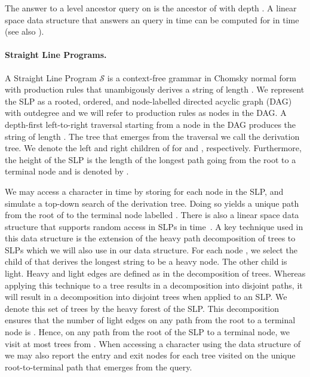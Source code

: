 \documentclass[11pt]{article}
\newcommand{\slp}{\ensuremath{\mathcal{S}} }
\begin{document}
The answer to a level ancestor query  on  is the ancestor of  with depth . A linear space data structure that answers an  query in  time can be computed for  in  time~\cite{dietz1991finding} (see also \cite{berkman1994finding,alstrup2000improved,bender2004level}).


\paragraph{Straight Line Programs.}
A Straight Line Program \slp is a context-free grammar in Chomsky normal form with  production rules that unambigously derives a string  of length . We represent the SLP as a rooted, ordered, and node-labelled directed acyclic graph (DAG) with outdegree  and we will refer to production rules as nodes in the DAG. A depth-first left-to-right traversal starting from a node  in the DAG produces the string  of length . The tree that emerges from the traversal we call the derivation tree. We denote the left and right children of  for  and , respectively. Furthermore, the height of the SLP is the length of the longest path going from the root to a terminal node and is denoted by .




We may access a character  in  time by storing  for each node  in the SLP, and simulate a top-down search of the derivation tree. Doing so yields a unique path from the root of  to the terminal node labelled . There is also a linear space data structure that supports random access in SLPs in  time~\cite{bille2011random}. A key technique used in this data structure is the extension of the heavy path decomposition of trees to SLPs which we will also use in our data structure. For each node , we select the child of  that derives the longest string to be a heavy node. The other child is light. Heavy and light edges are defined as in the decomposition of trees. Whereas applying this technique to a tree results in a decomposition into disjoint paths, it will result in a decomposition into disjoint trees when applied to an SLP. We denote this set of trees by the heavy forest  of the SLP. This decomposition ensures that the number of light edges on any path from the root to a terminal node is . Hence, on any path from the root of the SLP to a terminal node, we visit at most  trees from . When accessing a character using the data structure of \cite{bille2011random} we may also report the entry and exit nodes for each tree visited on the unique root-to-terminal path that emerges from the query.
\end{document}
